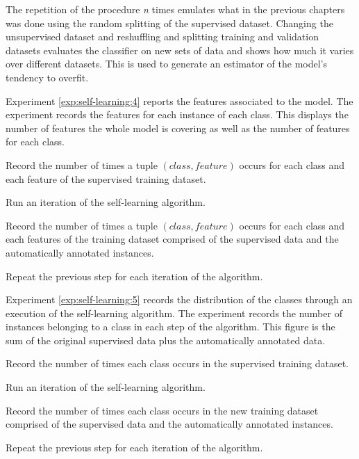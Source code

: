 The repetition of the procedure {\em n} times emulates what in the previous
chapters was done using the random splitting of the supervised dataset.
Changing the unsupervised dataset and reshuffling and splitting training and
validation datasets evaluates the classifier on new sets of data and shows how
much it varies over different datasets. This is used to generate an estimator
of the model's tendency to overfit.

Experiment \ref{exp:self-learning:4} reports the features associated to the
model. The experiment records the features for each instance of each class.
This displays the number of features the whole model is covering as well as the
number of features for each class.

\begin{experiment}\label{exp:self-learning:4}
  \begin{enumexp}
    \item Record the number of times a tuple $(class, feature)$ occurs for each
      class and each feature of the supervised training dataset.
    \item Run an iteration of the self-learning algorithm.
    \item Record the number of times a tuple $(class, feature)$ occurs for each
      class and each features of the training dataset comprised of the
      supervised data and the automatically annotated instances.
    \item Repeat the previous step for each iteration of the algorithm.
  \end{enumexp}
\end{experiment}

Experiment \ref{exp:self-learning:5} records the distribution of the classes
through an execution of the self-learning algorithm. The experiment records the
number of instances belonging to a class in each step of the algorithm. This
figure is the sum of the original supervised data plus the automatically
annotated data.

\begin{experiment}\label{exp:self-learning:5}
  \begin{enumexp}
    \item Record the number of times each class occurs in the supervised
      training dataset.
    \item Run an iteration of the self-learning algorithm.
    \item Record the number of times each class occurs in the new training
      dataset comprised of the supervised data and the automatically annotated
      instances.
    \item Repeat the previous step for each iteration of the algorithm.
  \end{enumexp}
\end{experiment}

